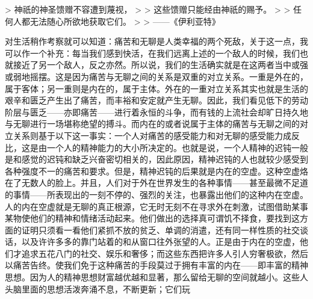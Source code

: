 \documentclass[12pt,oneside]{book}
\begin{document}
> 神祇的神圣馈赠不容遭到蔑视， 
>
> 这些馈赠只能经由神祇的赐予。 
>
> 任何人都无法随心所欲地获取它们。 
>
> ——《伊利亚特》 

 

对生活稍作考察就可以知道：痛苦和无聊是人类幸福的两个死敌，关于这一点，我可以作一个补充：每当我们感到快活，在我们远离上述的一个敌人的时候，我们也就接近了另一个敌人，反之亦然。所以说，我们的生活确实就是在这两者当中或强或弱地摇摆。这是因为痛苦与无聊之间的关系是双重的对立关系。一重是外在的，属于客体；另一重则是内在的，属于主体。外在的一重对立关系其实也就是生活的艰辛和匮乏产生出了痛苦，而丰裕和安定就产生无聊。因此，我们看见低下的劳动阶层与匮乏——亦即痛苦——进行着永恒的斗争，而有钱的上流社会却旷日持久地与无聊进行一场堪称绝望的搏斗。而内在的或者说属于主体的痛苦与无聊之间的对立关系则基于以下这一事实：一个人对痛苦的感受能力和对无聊的感受能力成反比，这是由一个人的精神能力的大小所决定的。也就是说，一个人精神的迟钝一般是和感觉的迟钝和缺乏兴奋密切相关的，因此原因，精神迟钝的人也就较少感受到各种强度不一的痛苦和要求。但是，精神迟钝的后果就是内在的空虚。这种空虚烙在了无数人的脸上。并且，人们对于外在世界发生的各种事情——甚至最微不足道的事情——所表现出的一刻不停的、强烈的关注，也暴露出他们的这种内在空虚。人的内在空虚就是无聊的真正根源，它无时无刻不在寻求外在刺激，试图借助某事某物使他们的精神和情绪活动起来。他们做出的选择真可谓饥不择食，要找到这方面的证明只须看一看他们紧抓不放的贫乏、单调的消遣，还有同一样性质的社交谈话，以及许许多多的靠门站着的和从窗口往外张望的人。正是由于内在的空虚，他们才追求五花八门的社交、娱乐和奢侈；而这些东西把许多人引人穷奢极欲，然后以痛苦告终。使我们免于这种痛苦的手段莫过于拥有丰富的内在——即丰富的精神思想。因为人的精神思想财富越优越和显著，那么留给无聊的空间就越小。这些人头脑里面的思想活泼奔涌不息，不断更新；它们玩
\end{document}
